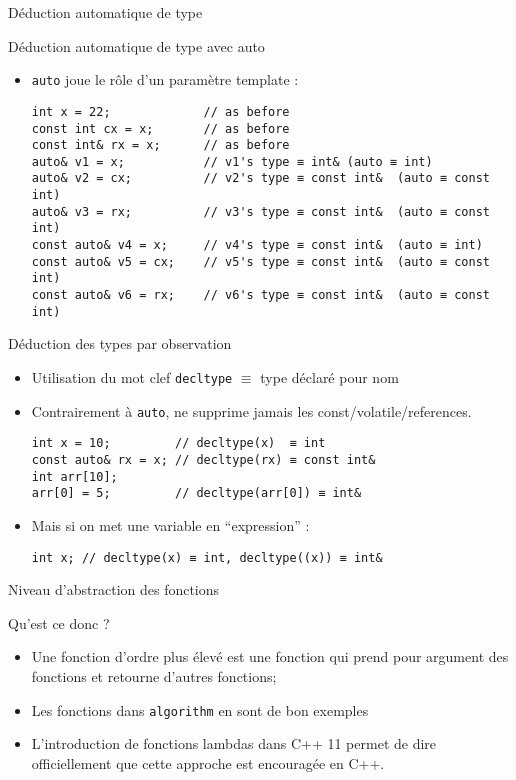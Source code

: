 \documentclass[handout,10pt]{beamer}
\begin{document}
\begin{frame}[fragile]{Déduction automatique de type}
\tiny
\begin{block}{Déduction automatique de type avec auto}
\begin{itemize}
 \item \lstinline$auto$ joue le rôle d'un paramètre template :
 \begin{lstlisting}
int x = 22;             // as before
const int cx = x;       // as before
const int& rx = x;      // as before
auto& v1 = x;           // v1's type ≡ int& (auto ≡ int)
auto& v2 = cx;          // v2's type ≡ const int&  (auto ≡ const int)
auto& v3 = rx;          // v3's type ≡ const int&  (auto ≡ const int)
const auto& v4 = x;     // v4's type ≡ const int&  (auto ≡ int)
const auto& v5 = cx;    // v5's type ≡ const int&  (auto ≡ const int)
const auto& v6 = rx;    // v6's type ≡ const int&  (auto ≡ const int)\end{lstlisting}
\end{itemize}
\end{block}

\begin{block}{Déduction des types par observation}
\begin{itemize}
 \item Utilisation du mot clef \lstinline$decltype$ $\equiv$ type déclaré pour nom
 \item Contrairement à \lstinline$auto$, ne supprime jamais les const/volatile/references.
\begin{lstlisting}
int x = 10;         // decltype(x)  ≡ int
const auto& rx = x; // decltype(rx) ≡ const int& 
int arr[10];
arr[0] = 5;         // decltype(arr[0]) ≡ int&
\end{lstlisting}
\item Mais si on met une variable en ``expression'' :
\begin{lstlisting}
int x; // decltype(x) ≡ int, decltype((x)) ≡ int&
\end{lstlisting}
\end{itemize}
\end{block}
\end{frame}

\begin{frame}[fragile]{Niveau d'abstraction des fonctions}
 \begin{block}{Qu'est ce donc ?}
  \begin{itemize}
   \item Une fonction d'ordre plus élevé est une fonction qui prend pour argument des fonctions et retourne
   d'autres fonctions;
   \item Les fonctions dans \lstinline$algorithm$ en sont de bon exemples
   \item L'introduction de fonctions lambdas dans C++ 11 permet de dire officiellement que cette approche est
   encouragée en C++.
  \end{itemize}
 \end{block}
\end{frame}
\end{document}

